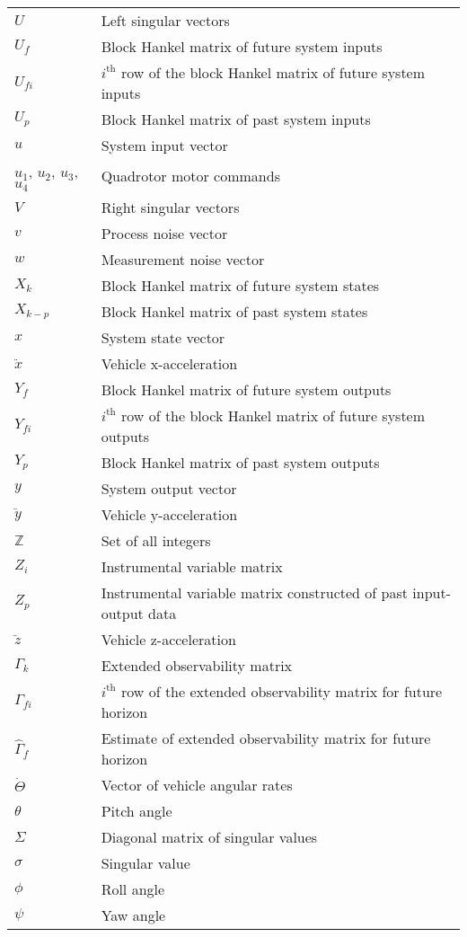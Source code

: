 {\begin{longtable}{p{7em}p{26em}}
$U$					& Left singular vectors\\
$U_f$				& Block Hankel matrix of future system inputs\\
$U_{fi}$			& $i^{\mbox{th}}$ row of the block Hankel matrix of future system inputs\\
$U_p$				& Block Hankel matrix of past system inputs\\
$u$					& System input vector\\
$u_1$, $u_2$, $u_3$, $u_4$	& Quadrotor motor commands\\
$V$					& Right singular vectors\\
$v$					& Process noise vector\\
$w$					& Measurement noise vector\\
$X_k$				& Block Hankel matrix of future system states\\
$X_{k-p}$			& Block Hankel matrix of past system states\\
$x$					& System state vector\\
$\ddot x$			& Vehicle x-acceleration \\
$Y_f$				& Block Hankel matrix of future system outputs\\
$Y_{fi}$			& $i^{\mbox{th}}$ row of the block Hankel matrix of future system outputs\\
$Y_p$				& Block Hankel matrix of past system outputs\\
$y$					& System output vector\\
$\ddot y$			& Vehicle y-acceleration \\
$\mathbb{Z}$ 		& Set of all integers\\
$Z_i$				& Instrumental variable matrix\\
$Z_p$				& Instrumental variable matrix constructed of past input-output data\\
$\ddot z$			& Vehicle z-acceleration \\[3em]


$\Gamma_k$			& Extended observability matrix\\
$\Gamma_{fi}$		& $i^{\mbox{th}}$ row of the extended observability matrix for future horizon\\
$\hat{\Gamma}_f$	& Estimate of extended observability matrix for future horizon\\
$\dot \Theta$		& Vector of vehicle angular rates \\
$\theta$					& Pitch angle\\
$\Sigma$			& Diagonal matrix of singular values\\
$\sigma$			& Singular value\\
$\phi$						& Roll angle\\
$\psi$						& Yaw angle\\
\end{longtable}

}